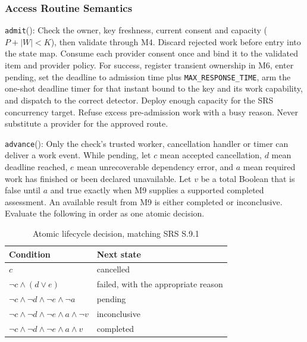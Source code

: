 \documentclass[12pt, titlepage]{article}
\newcommand{\Const}[1]{\texttt{#1}}
\begin{document}
\subsubsection{Access Routine Semantics}

\noindent \texttt{admit}():
Check the owner, key freshness, current consent and capacity ($P+|W|<K$), then validate through M4. Discard rejected work before entry into the state map. Consume each provider consent once and bind it to the validated item and provider policy. For success, register transient ownership in M6, enter pending, set the deadline to admission time plus \Const{MAX\_\allowbreak{}RESPONSE\_\allowbreak{}TIME}, arm the one-shot deadline timer for that instant bound to the key and its work capability, and dispatch to the correct detector. Deploy enough capacity for the SRS concurrency target. Refuse excess pre-admission work with a busy reason. Never substitute a provider for the approved route.

\medskip\noindent \texttt{advance}():
Only the check's trusted worker, cancellation handler or timer can deliver a work event. While pending, let $c$ mean accepted cancellation, $d$ mean deadline reached, $e$ mean unrecoverable dependency error, and $a$ mean required work has finished or been declared unavailable. Let $v$ be a total Boolean that is false until $a$ and true exactly when M9 supplies a supported completed assessment. An available result from M9 is either completed or inconclusive. Evaluate the following in order as one atomic decision.

\begin{table}[H]
\centering
\caption{Atomic lifecycle decision, matching SRS S.9.1}\label{TblLifecycle}
\begin{tabularx}{0.92\linewidth}{@{}lX@{}}
\toprule Condition & Next state \\ \midrule
$c$ & cancelled \\
$\neg c \land (d\lor e)$ & failed, with the appropriate reason \\
$\neg c \land \neg d \land \neg e \land \neg a$ & pending \\
$\neg c \land \neg d \land \neg e \land a \land \neg v$ & inconclusive \\
$\neg c \land \neg d \land \neg e \land a \land v$ & completed \\
\bottomrule
\end{tabularx}
\end{table}
\end{document}
